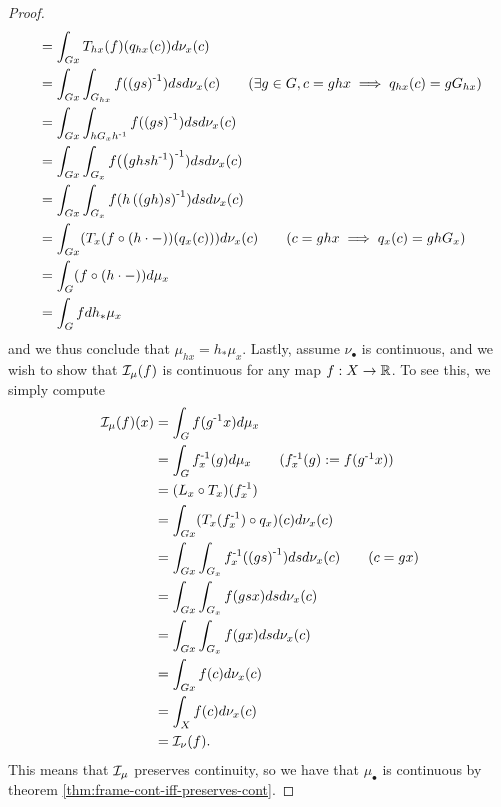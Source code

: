 \begin{theorem}
\begin{proof}
\begin{align*}
            &= \int_{G x} T_{hx} (f) (q_{hx}(c)) d \nu_{x} (c) \\
            &= \int_{G x} \int_{G_{hx}} f(\pinv{gs}) ds d \nu_x (c) \tag{$\exists g \in G, c = ghx \implies q_{hx}(c) = gG_{hx}$} \\
            &= \int_{G x} \int_{h G_x \inv{h}} f(\pinv{gs}) ds d \nu_x (c) \\
            &= \int_{G x} \int_{G_x} f(\pinv{ghs\inv{h}}) ds d \nu_x (c) \\
            &= \int_{G x} \int_{G_x} f(h\pinv{(gh)s}) ds d \nu_x (c) \\
            &= \int_{G x} (T_x(f \circ (h \cdot -)) (q_x(c))) d \nu_x (c) \tag{$c = ghx \implies q_x(c) = ghG_x$} \\
            &= \int_G (f \circ (h \cdot -)) d \mu_x \\
            &= \int_G f d h_* \mu_x
        \end{align*}
        and we thus conclude that $\mu_{hx} = h_* \mu_x$.
        Lastly, assume $\nu_\bullet$ is continuous, and we wish to show that $\mathcal{I}_\mu (f)$ is continuous for any map $f : X \to \mathbb{R}$.
        To see this, we simply compute
        \begin{align*}
            \II_\mu (f) (x)
            &= \int_G f (\inv{g} x) d \mu_x \\
            &= \int_G \inv{f}_x (g) d \mu_x \tag{$\inv{f}_x (g) := f(\inv{g} x)$} \\
            &= (L_x \circ T_x) (\inv{f}_x) \\
            &= \int_{Gx} (T_x (\inv{f}_x) \circ q_x) (c)  d \nu_x(c) \\
            &= \int_{Gx} \int_{G_x} \inv{f}_x (\pinv{g s}) ds d \nu_x(c) \tag{$c = gx$} \\
            &= \int_{Gx} \int_{G_x} f (g s x) ds d \nu_x (c) \\
            &= \int_{Gx} \int_{G_x} f (g x) ds d \nu_x (c) \\
            &= \int_{Gx} f (c) d \nu_x (c) \\
            &= \int_X f (c) d \nu_x (c) \\
            &= \II_\nu (f).
        \end{align*}
        This means that $\mathcal{I}_\mu$ preserves continuity, so we have that $\mu_\bullet$ is continuous by theorem \ref{thm:frame-cont-iff-preserves-cont}.


\end{proof}
\end{theorem}
